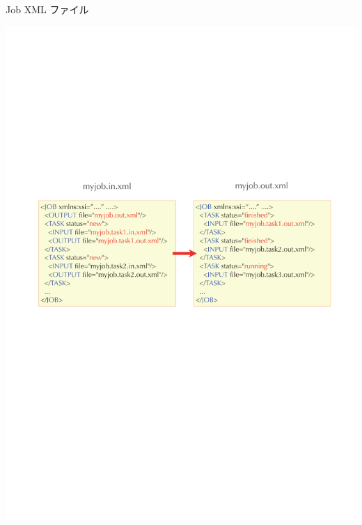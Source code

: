 \begin{frame}{Job XML ファイル}
  \begin{center}
    \includegraphics[height=.6\textheight]{simulation2.pdf}
  \end{center}
\end{frame}

